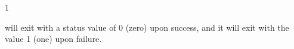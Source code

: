 \begin{ManPage}{\label{man-condor-userprio}}{1}
\begin{Options}
\end{Options}

\ExitStatus

 will exit with a status value of 0 (zero) upon success,
and it will exit with the value 1 (one) upon failure.

\end{ManPage}
